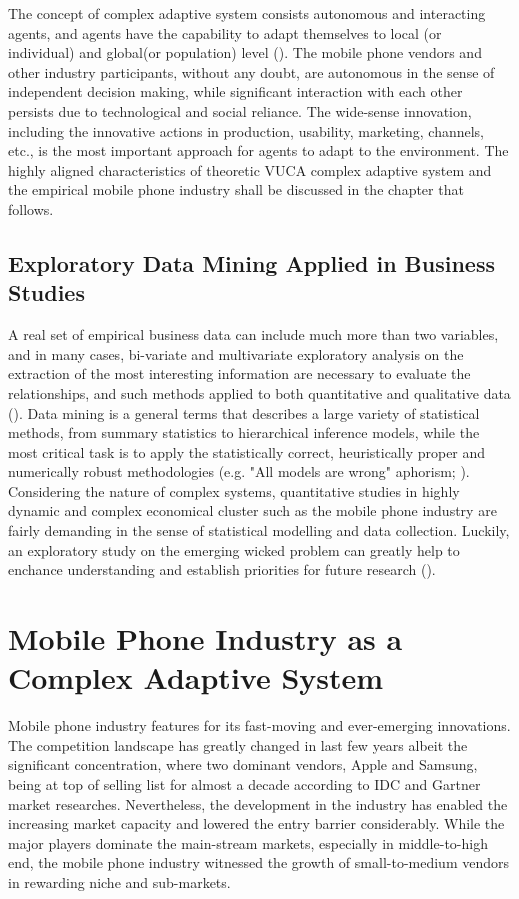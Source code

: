 \documentclass[utf8,english]{gradu3}
\begin{document}
The concept of complex adaptive system consists autonomous and interacting agents, and agents have the capability to adapt themselves to local (or individual) and global(or population) level (\cite{macal2010tutorial}). The mobile phone vendors and other industry participants, without any doubt, are autonomous in the sense of independent decision making, while significant interaction with each other persists due to technological and social reliance. The wide-sense innovation, including the innovative actions in production, usability, marketing, channels, etc., is the most important approach for agents to adapt to the environment. The highly aligned characteristics of theoretic VUCA complex adaptive system and the empirical mobile phone industry shall be discussed in the chapter that follows. 

\section{Exploratory Data Mining Applied in Business Studies}

A real set of empirical business data can include much more than two variables, and in many cases, bi-variate and multivariate exploratory analysis on the extraction of the most interesting information are necessary to evaluate the relationships, and such methods applied to both quantitative and qualitative data (\cite{giudici2005applied}). Data mining is a general terms that describes a large variety of statistical methods, from summary statistics to hierarchical inference models, while the most critical task is to apply the statistically correct, heuristically proper and numerically robust methodologies (e.g. "All models are wrong" aphorism; \cite{box1979robustness}). Considering the nature of complex systems, quantitative studies in highly dynamic and complex economical cluster such as the mobile phone industry are fairly demanding in the sense of statistical modelling and data collection. Luckily, an exploratory study on the emerging wicked problem can greatly help to enchance understanding and establish priorities for future research (\cite{shields2013playbook}).

\chapter{Mobile Phone Industry as a Complex Adaptive System}

Mobile phone industry features for its fast-moving and ever-emerging innovations. The competition landscape has greatly changed in last few years albeit the significant concentration, where two dominant vendors, Apple and Samsung, being at top of selling list for almost a decade according to IDC and Gartner market researches. Nevertheless, the development in the industry has enabled the increasing market capacity and lowered the entry barrier considerably. While the major players dominate the main-stream markets, especially in middle-to-high end, the mobile phone industry witnessed the growth of small-to-medium vendors in rewarding niche and sub-markets.
\end{document}
